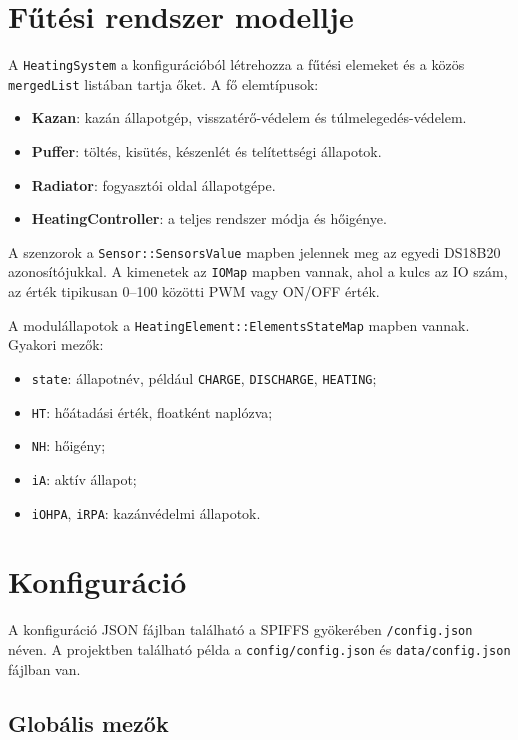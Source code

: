 \documentclass[11pt,a4paper]{article}
\begin{document}
\section{Fűtési rendszer modellje}

A \texttt{HeatingSystem} a konfigurációból létrehozza a fűtési elemeket és a közös \texttt{mergedList} listában tartja őket. A fő elemtípusok:

\begin{itemize}
  \item \textbf{Kazan}: kazán állapotgép, visszatérő-védelem és túlmelegedés-védelem.
  \item \textbf{Puffer}: töltés, kisütés, készenlét és telítettségi állapotok.
  \item \textbf{Radiator}: fogyasztói oldal állapotgépe.
  \item \textbf{HeatingController}: a teljes rendszer módja és hőigénye.
\end{itemize}

A szenzorok a \texttt{Sensor::SensorsValue} mapben jelennek meg az egyedi DS18B20 azonosítójukkal. A kimenetek az \texttt{IOMap} mapben vannak, ahol a kulcs az IO szám, az érték tipikusan 0--100 közötti PWM vagy ON/OFF érték.

A modulállapotok a \texttt{HeatingElement::ElementsStateMap} mapben vannak. Gyakori mezők:

\begin{itemize}
  \item \texttt{state}: állapotnév, például \texttt{CHARGE}, \texttt{DISCHARGE}, \texttt{HEATING};
  \item \texttt{HT}: hőátadási érték, floatként naplózva;
  \item \texttt{NH}: hőigény;
  \item \texttt{iA}: aktív állapot;
  \item \texttt{iOHPA}, \texttt{iRPA}: kazánvédelmi állapotok.
\end{itemize}

\section{Konfiguráció}

A konfiguráció JSON fájlban található a SPIFFS gyökerében \texttt{/config.json} néven. A projektben található példa a \texttt{config/config.json} és \texttt{data/config.json} fájlban van.

\subsection{Globális mezők}
\end{document}

